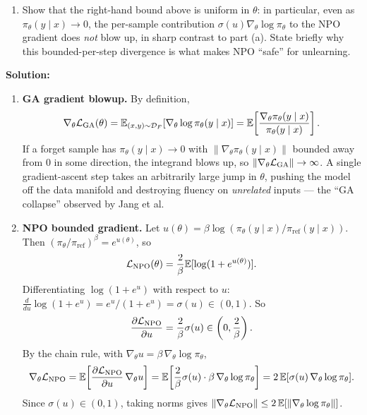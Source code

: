\documentclass[12pt]{article}
\renewcommand{\fE}{\mathbb{E}}
\begin{document}
\begin{enumerate}
\begin{enumerate}
    \item Show that the right-hand bound above is uniform in $\theta$: in particular, even as $\pi_\theta(y \mid x) \to 0$, the per-sample contribution $\sigma(u)\nabla_\theta \log\pi_\theta$ to the NPO gradient does \emph{not} blow up, in sharp contrast to part (a). State briefly why this bounded-per-step divergence is what makes NPO ``safe'' for unlearning.
\end{enumerate}

\begin{solution}
{\bf Solution:}\\
\begin{enumerate}
    \item \textbf{GA gradient blowup.} By definition,
    \begin{align*}
        \nabla_\theta \cL_{\mathrm{GA}}(\theta) = \fE_{(x,y) \sim \cD_F}[\nabla_\theta \log\pi_\theta(y \mid x)] = \fE\!\left[\frac{\nabla_\theta \pi_\theta(y \mid x)}{\pi_\theta(y \mid x)}\right].
    \end{align*}
    If a forget sample has $\pi_\theta(y \mid x) \to 0$ with $\|\nabla_\theta \pi_\theta(y \mid x)\|$ bounded away from $0$ in some direction, the integrand blows up, so $\|\nabla_\theta {\cal L}_{\mathrm{GA}}\| \to \infty$. A single gradient-ascent step takes an arbitrarily large jump in $\theta$, pushing the model off the data manifold and destroying fluency on \emph{unrelated} inputs --- the ``GA collapse'' observed by Jang et al.

    \item \textbf{NPO bounded gradient.} Let $u(\theta) = \beta\log(\pi_\theta(y \mid x)/\pi_{\mathrm{ref}}(y \mid x))$. Then $(\pi_\theta/\pi_{\mathrm{ref}})^\beta = e^{u(\theta)}$, so
    \begin{align*}
        \cL_{\mathrm{NPO}}(\theta) = \frac{2}{\beta}\fE[\log(1 + e^{u(\theta)})].
    \end{align*}
    Differentiating $\log(1 + e^u)$ with respect to $u$: $\frac{d}{du}\log(1 + e^u) = e^u/(1 + e^u) = \sigma(u) \in (0, 1)$. So
    \begin{align*}
        \frac{\partial {\cal L}_{\mathrm{NPO}}}{\partial u} = \frac{2}{\beta} \sigma(u) \in \left(0, \frac{2}{\beta}\right).
    \end{align*}
    By the chain rule, with $\nabla_\theta u = \beta\,\nabla_\theta \log\pi_\theta$,
    \begin{align*}
        \nabla_\theta \cL_{\mathrm{NPO}} = \fE\!\left[\frac{\partial \cL_{\mathrm{NPO}}}{\partial u}\,\nabla_\theta u\right] = \fE\!\left[\frac{2}{\beta}\sigma(u)\cdot \beta\, \nabla_\theta \log\pi_\theta\right] = 2\,\fE[\sigma(u)\,\nabla_\theta \log\pi_\theta].
    \end{align*}
    Since $\sigma(u) \in (0, 1)$, taking norms gives $\|\nabla_\theta \cL_{\mathrm{NPO}}\| \le 2\,\fE[\|\nabla_\theta \log\pi_\theta\|]$.


\end{enumerate}
\end{solution}
\end{enumerate}
\end{document}

